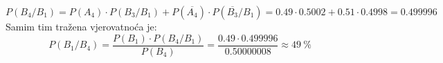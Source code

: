 \documentclass[12pt]{article}
\begin{document}
\begin{enumerate}
\begin{equation*}
\end{equation*}
\begin{equation*}
    P(B_4/B_1) = P(A_4) \cdot P(B_3/B_1) + P(\overline{A_4}) \cdot P(\overline{B_3}/B_1) = 0.49 \cdot 0.5002 +
    0.51 \cdot 0.4998 = 0.499996
\end{equation*}
Samim tim tražena vjerovatnoća je:
\begin{equation*}
    P(B_1/B_4) = \frac{P(B_1) \cdot P(B_4/B_1)}{P(B_4)} = \frac{0.49 \cdot 0.499996}{0.50000008} \approx
     49 ~\%
\end{equation*}
	\end{enumerate}
	
	
	
    
\end{document}

